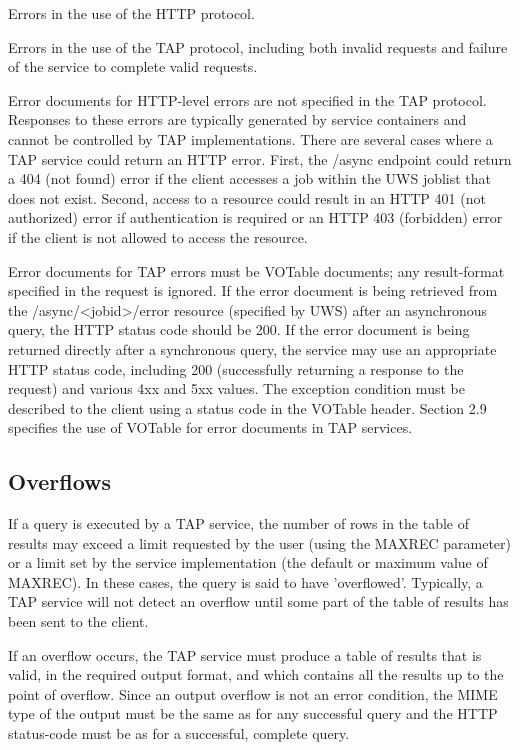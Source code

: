 \documentclass[11pt,letter]{ivoa}
\begin{document}
{Errors in the use of the HTTP protocol. 

Errors in the use of the TAP protocol, including both invalid requests and 
failure of the service to complete valid requests. 

Error documents for HTTP-level errors are not specified in the TAP protocol. 
Responses to these errors are typically generated by service containers and 
cannot be controlled by TAP implementations. There are several cases where a 
TAP 
service could return an HTTP error. First, the /async endpoint could return a 
404 (not found) error if the client accesses a job within the UWS joblist that 
does not exist. Second, access to a resource could result in an HTTP 401 (not 
authorized) error if authentication is required or an HTTP 403 (forbidden) 
error if the client is not allowed to access the resource.

Error documents for TAP errors must be VOTable documents;  any result-format 
specified in the request is ignored. If the error document is being retrieved 
from the /async/<jobid>/error resource (specified by UWS) after an asynchronous 
query, the HTTP status code should be 200. If the error document is being 
returned directly after a synchronous query, the service may use an appropriate 
HTTP status code, including 200 (successfully returning a response to the 
request) and various 4xx and 5xx values. The exception condition must be 
described to the client using a status code in the VOTable header.  Section   
2.9 specifies the use of VOTable for error documents in TAP services. 

\subsection{Overflows}
\label{sec:query-overflow}

If a query is executed by a TAP service, the number of rows in the table of 
results may exceed a limit requested by the user (using the MAXREC parameter) 
or a limit set by the service implementation (the default or maximum value of 
MAXREC). In these cases, the query is said to have 'overflowed'. Typically, a 
TAP service will not detect an overflow until some part of the table of results 
has been sent to the client.

If an overflow occurs, the TAP service must produce a table of results that is 
valid, in the required output format, and which contains all the results up to 
the point of overflow. Since an output overflow is not an error condition, the 
MIME type of the output must be the same as for any successful query and the 
HTTP status-code must be as for a successful, complete query.

}
\end{document}
